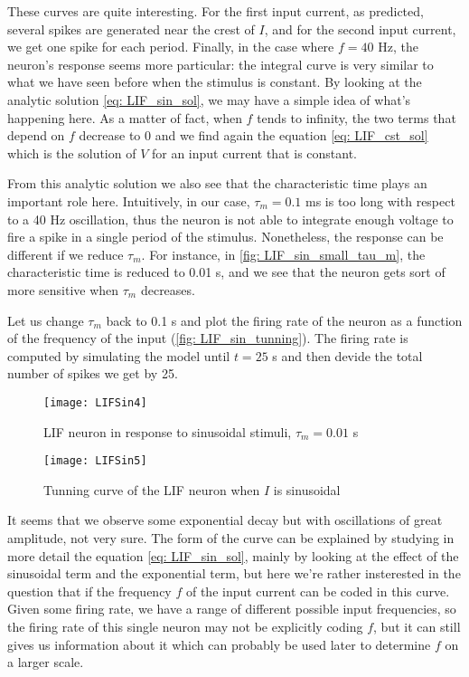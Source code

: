 These curves are quite interesting. For the first input current, as predicted,
several spikes are generated near the crest of $I$, and for the second
input current, we get one spike for each period. Finally, in the case 
where $f = 40$ Hz, the neuron's response seems more particular: the integral
curve is very similar to what we have seen before when the stimulus is 
constant. By looking at the analytic solution \eqref{eq: LIF_sin_sol}, we
may have a simple idea of what's happening here. As a matter of fact, when 
$f$ tends to infinity, the two terms that depend on $f$ decrease to 0
and we find again the equation \eqref{eq: LIF_cst_sol} which is the solution
of $V$ for an input current that is constant.

From this analytic solution we also see that the characteristic time
plays an important role here. Intuitively, in our case, $\tau_m = 0.1$ ms
is too long with respect to a 40 Hz oscillation, thus the neuron is not able
to integrate enough voltage to fire a spike in a single period of the 
stimulus. Nonetheless, the response can be different if we reduce $\tau_m$.
For instance, in \autoref{fig: LIF_sin_small_tau_m}, the characteristic time
is reduced to 0.01 s, and we see that the neuron gets sort of more sensitive 
when $\tau_m$ decreases. 

Let us change $\tau_m$ back to 0.1 s and plot the firing rate of the neuron
as a function of the frequency of the input (\autoref{fig: LIF_sin_tunning}). 
The firing rate is computed by simulating the  model until $t = 25$ s and 
then devide the total number of spikes we get by 25.

\vspace{-1em}
\begin{figure}[H]
  \centering
  \texttt{[image: LIFSin4]}
  \caption{LIF neuron in response to sinusoidal stimuli, $\tau_m = 0.01$ s}
  \label{fig: LIF_sin_small_tau_m}
\end{figure}

\vspace{-1em}
\begin{figure}[H]
  \centering
  \texttt{[image: LIFSin5]}
  \caption{Tunning curve of the LIF neuron when $I$ is sinusoidal}
  \label{fig: LIF_sin_tunning}
\end{figure}

It seems that we observe some exponential decay but with oscillations of
great amplitude, not very sure. The form of the curve can be explained by 
studying in more detail the equation \eqref{eq: LIF_sin_sol}, mainly by
looking at the effect of the sinusoidal term and the exponential term,
but here we're rather insterested in the question that if the frequency $f$
of the input current can be coded in this curve. Given some firing rate, we
have a range of different possible input frequencies, so the firing rate of
this single neuron may not be explicitly coding $f$, but it can still gives
us information about it which can probably be used later to determine $f$
on a larger scale.

